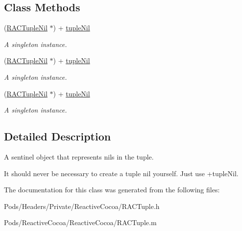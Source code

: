 \subsection*{Class Methods}
\begin{DoxyCompactItemize}
\item 
\mbox{\label{interface_r_a_c_tuple_nil_a14c7477e950fd45cff3aecc2ee11c688}} 
(\mbox{\hyperlink{interface_r_a_c_tuple_nil}{R\+A\+C\+Tuple\+Nil}} $\ast$) + \mbox{\hyperlink{interface_r_a_c_tuple_nil_a14c7477e950fd45cff3aecc2ee11c688}{tuple\+Nil}}
\begin{DoxyCompactList}\small\item\em A singleton instance. \end{DoxyCompactList}\item 
\mbox{\label{interface_r_a_c_tuple_nil_a14c7477e950fd45cff3aecc2ee11c688}} 
(\mbox{\hyperlink{interface_r_a_c_tuple_nil}{R\+A\+C\+Tuple\+Nil}} $\ast$) + \mbox{\hyperlink{interface_r_a_c_tuple_nil_a14c7477e950fd45cff3aecc2ee11c688}{tuple\+Nil}}
\begin{DoxyCompactList}\small\item\em A singleton instance. \end{DoxyCompactList}\item 
\mbox{\label{interface_r_a_c_tuple_nil_a14c7477e950fd45cff3aecc2ee11c688}} 
(\mbox{\hyperlink{interface_r_a_c_tuple_nil}{R\+A\+C\+Tuple\+Nil}} $\ast$) + \mbox{\hyperlink{interface_r_a_c_tuple_nil_a14c7477e950fd45cff3aecc2ee11c688}{tuple\+Nil}}
\begin{DoxyCompactList}\small\item\em A singleton instance. \end{DoxyCompactList}\end{DoxyCompactItemize}


\subsection{Detailed Description}
A sentinel object that represents nils in the tuple.

It should never be necessary to create a tuple nil yourself. Just use +tuple\+Nil. 

The documentation for this class was generated from the following files\+:\begin{DoxyCompactItemize}
\item 
Pods/\+Headers/\+Private/\+Reactive\+Cocoa/R\+A\+C\+Tuple.\+h\item 
Pods/\+Reactive\+Cocoa/\+Reactive\+Cocoa/R\+A\+C\+Tuple.\+m\end{DoxyCompactItemize}
